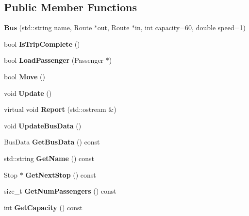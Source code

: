 \subsection*{Public Member Functions}
\begin{DoxyCompactItemize}
\item 
\mbox{\label{classBus_aa28c3c318b6993f3a3aebf211daa9217}} 
{\bfseries Bus} (std\+::string name, Route $\ast$out, Route $\ast$in, int capacity=60, double speed=1)
\item 
\mbox{\label{classBus_a9c64b0801bf589f121fb0598b70a99b4}} 
bool {\bfseries Is\+Trip\+Complete} ()
\item 
\mbox{\label{classBus_ac3f1c523bc4f97bc8ada8dc488ab3484}} 
bool {\bfseries Load\+Passenger} (Passenger $\ast$)
\item 
\mbox{\label{classBus_a5e667186d6db0916ebab0e4eff3312c8}} 
bool {\bfseries Move} ()
\item 
\mbox{\label{classBus_a9896f74f16966f7621d0dfafff0ec6b4}} 
void {\bfseries Update} ()
\item 
\mbox{\label{classBus_a4e50209dde52bff3de231c8259b38982}} 
virtual void {\bfseries Report} (std\+::ostream \&)
\item 
\mbox{\label{classBus_a38b7ee7b13b3438894e914a6933a6f44}} 
void {\bfseries Update\+Bus\+Data} ()
\item 
\mbox{\label{classBus_aee8d077fc426b73942dec2564b5d066a}} 
Bus\+Data {\bfseries Get\+Bus\+Data} () const
\item 
\mbox{\label{classBus_a2143b0563ad48b1b67e114d1ba5342ca}} 
std\+::string {\bfseries Get\+Name} () const
\item 
\mbox{\label{classBus_a6068e9801c6da152f05e40eb26e80b02}} 
Stop $\ast$ {\bfseries Get\+Next\+Stop} () const
\item 
\mbox{\label{classBus_a346aaa56030d4707886e1db8181e8b55}} 
size\+\_\+t {\bfseries Get\+Num\+Passengers} () const
\item 
\mbox{\label{classBus_a3a1f68e9e2548f981d0150901918922c}} 
int {\bfseries Get\+Capacity} () const
\end{DoxyCompactItemize}


